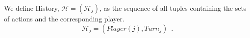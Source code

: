 {}
\begin{definition}[History]
  We define History, $\mathcal{H} = \left(\mathcal{H}_j\right)$, as the sequence of all tuples containing the sets
  of actions and the corresponding player.
  \begin{equation}
    \mathcal{H}_j = \left(Player\left(j\right), Turn_j\right) \enspace.
  \end{equation}
\end{definition}
